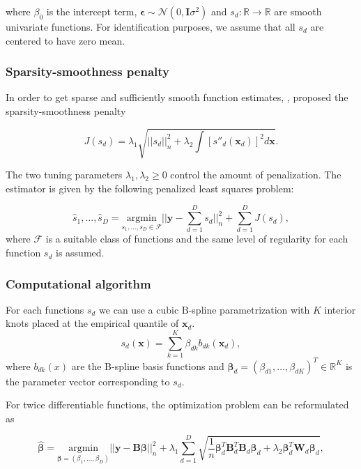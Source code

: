 \documentclass[]{book}
\begin{document}
where \(\beta_0\) is the intercept term,
\(\boldsymbol{\epsilon} \sim \mathcal{N}(0, \mathbf{I}\sigma^2)\) and
\(s_d : \mathbb{R} \rightarrow \mathbb{R}\) are smooth univariate
functions. For identification purposes, we assume that all \(s_d\) are
centered to have zero mean.

\hypertarget{sparsity-smoothness-penalty}{%
\subsubsection*{Sparsity-smoothness penalty}\label{sparsity-smoothness-penalty}}

In order to get sparse and sufficiently smooth function estimates,
\citep{meier_high-dimensional_2009}, proposed the sparsity-smoothness penalty

\[J(s_d) = \lambda_1\sqrt{||s_d||^2_n + \lambda_2\int[s''_d(\boldsymbol{x}_d)]^2d\boldsymbol{x}}.\]

The two tuning parameters \(\lambda_1, \lambda_2 \geq 0\) control the
amount of penalization. The estimator is given by the following
penalized least squares problem:

\[\hat{s}_1,\dots,\hat{s}_D = \underset{s_1,\dots,s_D\in\mathcal{F}}{\text{argmin}} ||\mathbf{y} - \sum_{d=1}^D s_d||_n^2 + \sum_{d=1}^D J(s_d),\]
where \(\mathcal{F}\) is a suitable class of functions and the same level
of regularity for each function \(s_d\) is assumed.

\hypertarget{computational-algorithm}{%
\subsubsection*{Computational algorithm}\label{computational-algorithm}}

For each functions \(s_d\) we can use a cubic \(\mathrm{B}\)-spline
parametrization with \(K\) interior knots placed at the empirical quantile
of \(\boldsymbol{x}_d\). \[s_d(\boldsymbol{x}) = \sum_{k=1}^K\beta_{dk}b_{dk}(\boldsymbol{x}_d),\] where
\(b_{dk}(x)\) are the B-spline basis functions and
\(\boldsymbol{\beta}_d = (\beta_{d1},\dots,\beta_{dK})^T \in \mathbb{R}^K\) is the
parameter vector corresponding to \(s_d\).

For twice differentiable functions, the optimization problem can be
reformulated as

\[\hat{\boldsymbol{\beta}} = \underset{\boldsymbol{\beta}=(\beta_1,\dots,\beta_D)}{\text{argmin}} ||\mathbf{y} - \mathbf{B}\boldsymbol{\beta}||_n^2 + \lambda_1 \sum_{d=1}^D \sqrt{\frac{1}{n} \boldsymbol{\beta}_d^T\mathbf{B}_d^T\mathbf{B}_d\boldsymbol{\beta}_d + 
\lambda_2 \boldsymbol{\beta}_d^T \mathbf{W}_d\boldsymbol{\beta}_d},\]
\end{document}
